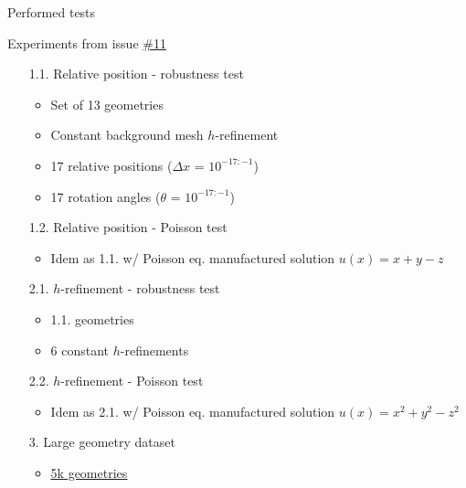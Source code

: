 \documentclass{beamer}
\title{}
\subtitle{STLCutter.jl}
\date{\today}
\author{Pere Antoni Martorell}
\institute{\url{http://github.com/pmartorell/STLCutters.jl}}
\begin{document}
\maketitle
\begin{frame}{Performed tests}

  Experiments from issue
  \href{https://github.com/pmartorell/STLCutters.jl/issues/11}{\#11}

  \vfill{}

  \begin{itemize}
    \item[1.1.] 
      Relative position - robustness test
      \begin{itemize}
        \item
          Set of 13 geometries
        \item
          Constant background mesh $h$-refinement%
        \item
          17 relative positions ($\Delta x$ = $10^{-17:-1}$)
        \item
          17 rotation angles ($\theta$ = $10^{-17:-1}$)
      \end{itemize}
    \item[1.2.]
      Relative position - Poisson test
      \begin{itemize}
        \item
          Idem as 1.1. w/ Poisson eq. manufactured solution $u(x) = x+y-z$
      \end{itemize}
    \item[2.1.]
      $h$-refinement - robustness test
      \begin{itemize}
        \item
          1.1. geometries
        \item
          6 constant $h$-refinements
      \end{itemize}
    \item[2.2.]
      $h$-refinement - Poisson test
      \begin{itemize}
        \item
          Idem as 2.1. w/ Poisson eq. manufactured solution $u(x) = x^2+y^2-z^2$
      \end{itemize}
    \item[3.] Large geometry dataset
      \begin{itemize}
        \item   
          \href{https://ten-thousand-models.appspot.com/results.html?q=is+closed\%2C+is+oriented\%2C+is+manifold\%2C+is+not+degenerate\%2C+without+self-intersection\%2C+\%23df\%3D0}{\underline{5k geometries}}

\end{itemize}
\end{itemize}
\end{frame}
\end{document}
